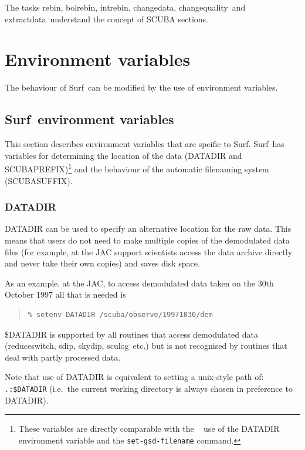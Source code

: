 \documentclass[twoside,11pt]{article}
\newcommand{\scusoft}          {{\sc Surf}}
\newcommand{\specx}{\xref{{\sc{Specx}}}{sc8}{}}
\newcommand{\task}[1]{{\sf #1}}
\newcommand{\rebin}{\htmlref{\task{rebin}}{REBIN}}
\newcommand{\bolrebin}{\htmlref{\task{bolrebin}}{BOLREBIN}}
\newcommand{\intrebin}{\htmlref{\task{intrebin}}{INTREBIN}}
\newcommand{\chgqual}{\htmlref{\task{change\_quality}}{CHANGE_QUALITY}}
\newcommand{\chgdata}{\htmlref{\task{change\_data}}{CHANGE_DATA}}
\newcommand{\resw}{\htmlref{\task{reduce\_switch}}{REDUCE_SWITCH}}
\newcommand{\skydip}{\htmlref{\task{skydip}}{SKYDIP}}
\newcommand{\extdata}{\htmlref{\task{extract\_data}}{EXTRACT_DATA}}
\newcommand{\sculog}{\htmlref{\task{sculog}}{SCULOG}}
\newcommand{\sdip}{\htmlref{\task{sdip}}{SDIP}}
\newenvironment{myquote}{\begin{quote}\begin{small}}{\end{small}\end{quote}}
\newcommand{\htmlref}[2]{#1}
\newcommand{\xref}[3]{#1}
\newcommand{\xlabel}[1]{}
\renewcommand{\_}{\texttt{\symbol{95}}}
\begin{document}
The tasks \rebin, \bolrebin, \intrebin, \chgdata, \chgqual\ and
\extdata\ understand the concept of SCUBA sections.


\section{\xlabel{env}Environment variables\label{env}}

The behaviour of \scusoft\ can be modified by the use of environment
variables. 

\subsection{\scusoft\ environment variables}

This section describes environment variables that are spcific to \scusoft.
\scusoft\ has variables for determining the location of the data (DATADIR and
SCUBA\_PREFIX)\footnote{These variables are directly comparable with the
\specx\ \cite{specx} use of the DATADIR environment variable and the
\texttt{set-gsd-filename} command.} and the behaviour of the automatic
filenaming system (SCUBA\_SUFFIX). 

\subsubsection{DATADIR}

DATADIR can be used to specify an alternative location for the raw data.
This means that users do not need to make multiple copies of the demodulated
data files (for example, at the JAC support scientists access the data archive 
directly and never take their own copies) and saves disk space.

As an example, at the JAC, to access demodulated data taken on the 30th
October 1997 all that is needed is
\begin{myquote}
\begin{verbatim}
% setenv DATADIR /scuba/observe/19971030/dem
\end{verbatim}
\end{myquote}
\$DATADIR is supported by all routines that access demodulated data
(\resw, \sdip, \skydip, \sculog\ etc.) but is not recognised by routines that
deal with partly processed data.

Note that use of DATADIR is equivalent to setting a unix-style path of:
\verb+.:$DATADIR+ (i.e.\ the current working directory is always chosen in
preference to DATADIR).


\end{document}
